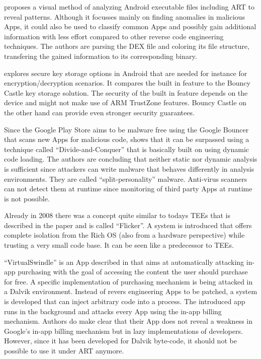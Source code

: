 \parencite{visual_exploration} proposes a visual method of analyzing Android
executable files including ART to reveal patterns. Although it focusses mainly
on finding anomalies in malicious Apps, it could also be used to classify
common Apps and possibly gain additional information with less effort compared
to other reverse code engineering techniques. The authors are parsing the
DEX file and coloring its file structure, transfering the gained information
to its corresponding binary.

\parencite{key_storage} explores secure key storage options in Android that are needed for instance for encryption/decryption scenarios. It compares the built in
feature to the Bouncy Castle key storage solution. The security of the
built in feature depends on the device and might not make use of ARM
TrustZone features. Bouncy Castle on the other hand can provide even stronger
security guarantees.

Since the Google Play Store aims to be malware free using the Google Bouncer that scans new Apps for malicious code, \parencite{divide_and_conquer}
shows that it can be surpassed using a technique called ``Divide-and-Conquer''
that is basically built on using dynamic code loading. The authors are concluding
that neither static nor dynamic analysis is sufficient since attackers can write
malware that behaves differently in analysis environments. They are called
``split-personality'' malware. Anti-virus scanners can not detect them at runtime
since monitoring of third party Apps at runtime is not possible.

Already in 2008 there was a concept quite similar to todays TEEs that is described in the paper \parencite{flicker} and is called ``Flicker''.
A system is introduced that offers complete isolation from the Rich OS (also from a hardware perspective) while trusting a very small code base. It can be seen like a predecessor to TEEs.

``VirtualSwindle'' is an App described in \parencite{virtualswindle} that
aims at automatically attacking in-app purchasing with the goal of accessing the content the user should purchase for free. A specific implementation of purchasing mechanism is being attacked in a Dalvik environment. Instead of revers engineering Apps to be patched, a system is developed that can inject arbitrary code into a process. The introduced app runs in the background and attacks every App using
the in-app billing mechanism. Authors do make clear that their App does not reveal a weakness in Google's in-app billing mechanism but in lazy implementations of developers. However, since it has been developed for Dalvik byte-code, it should not be possible to use it under ART anymore.

